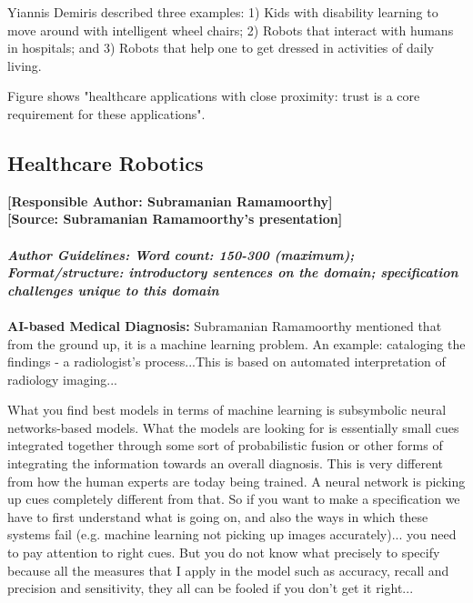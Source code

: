\documentclass[sigconf]{acmart}
\begin{document}
Yiannis Demiris described three examples: 
1) Kids with disability learning to move around with intelligent wheel chairs; 2) Robots that interact with humans in hospitals; and 3) Robots that help one to get dressed in activities of daily living.

Figure shows "healthcare applications with close proximity: trust is a core requirement for these applications".

\subsection{Healthcare Robotics}
\textbf{[Responsible Author:  Subramanian Ramamoorthy]}\\
\noindent\textbf{[Source: Subramanian Ramamoorthy's presentation]}\\\\
\noindent\textbf{\textit{Author Guidelines: Word count: 150-300 (maximum); \\Format/structure: introductory sentences on the domain; specification challenges unique to this domain}}\\\\
\textbf{AI-based Medical Diagnosis:} Subramanian Ramamoorthy mentioned that from the ground up, it is a machine learning problem. 
An example: cataloging the findings - a radiologist's process...This is based on automated interpretation of radiology imaging...
 
What you find best models in terms of machine learning is subsymbolic neural networks-based models. What the models are looking for is essentially small cues integrated together through some sort of  probabilistic fusion or other forms of integrating the information towards an overall diagnosis. This is very different from how the human experts are today being trained. A neural network is picking up cues completely different from that. So if you want to make a specification we have to first understand what is going on, and also the ways in which these systems fail (e.g. machine learning not picking up images accurately)... you need to pay attention to right cues. But you do not know what precisely to specify because all the measures that I apply in the model such as accuracy, recall and precision and sensitivity,  they all can be fooled if you don't get it right...
\end{document}

